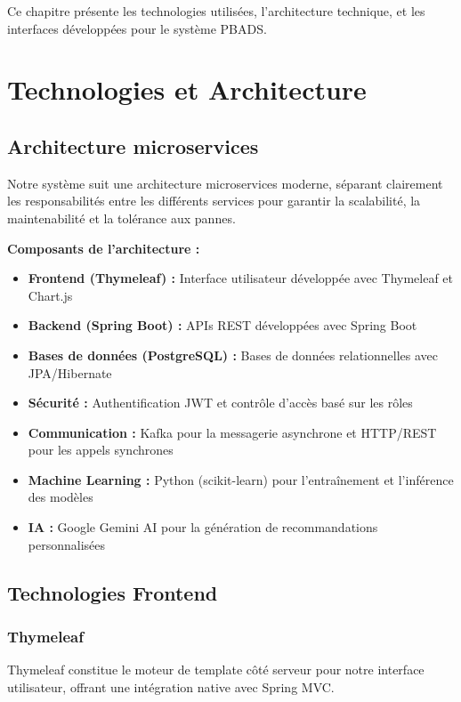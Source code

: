 Ce chapitre présente les technologies utilisées, l'architecture technique, et les interfaces développées pour le système PBADS.

\section{Technologies et Architecture}

\subsection{Architecture microservices}

Notre système suit une architecture microservices moderne, séparant clairement les responsabilités entre les différents services pour garantir la scalabilité, la maintenabilité et la tolérance aux pannes.

\textbf{Composants de l'architecture :}

\begin{itemize}
    \item \textbf{Frontend (Thymeleaf) :} Interface utilisateur développée avec Thymeleaf et Chart.js
    \item \textbf{Backend (Spring Boot) :} APIs REST développées avec Spring Boot
    \item \textbf{Bases de données (PostgreSQL) :} Bases de données relationnelles avec JPA/Hibernate
    \item \textbf{Sécurité :} Authentification JWT et contrôle d'accès basé sur les rôles
    \item \textbf{Communication :} Kafka pour la messagerie asynchrone et HTTP/REST pour les appels synchrones
    \item \textbf{Machine Learning :} Python (scikit-learn) pour l'entraînement et l'inférence des modèles
    \item \textbf{IA :} Google Gemini AI pour la génération de recommandations personnalisées
\end{itemize}

\subsection{Technologies Frontend}

\subsubsection{Thymeleaf}

Thymeleaf constitue le moteur de template côté serveur pour notre interface utilisateur, offrant une intégration native avec Spring MVC.

